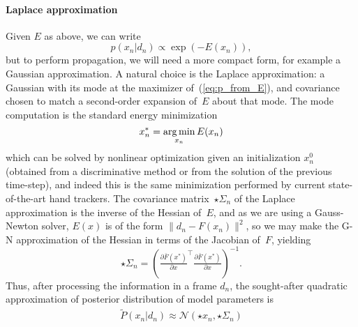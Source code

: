 \paragraph{Laplace approximation}
\label{sec:posterior}
Given $E$ as above, we can write
\begin{equation}
p(x_n|d_n) \propto \exp(-E(x_n)), 
\label{eq:p_from_E}
\end{equation}
but to perform propagation, we will need a more compact form, for example a Gaussian approximation.   A natural choice is the Laplace approximation: a Gaussian with its mode at the maximizer of~(\ref{eq:p_from_E}), and covariance chosen to match a second-order expansion of~$E$ about that mode.
The mode computation is the standard energy minimization
\begin{equation}
{x}^*_n = \operatorname*{arg\,min}_{x_n} E(x_n)
\label{eq:xmin}
\end{equation}
which can be solved by nonlinear optimization given an initialization $x_n^0$ (obtained from a discriminative method or from the solution of the previous time-step), and indeed this is the same minimization performed by current state-of-the-art hand trackers.
The covariance matrix~$\star\Sigma_n$ of the Laplace approximation is the inverse of the Hessian of~$E$, and as we are using a Gauss-Newton solver, $E(x)$ is of the form $\|d_n - F(x_n)\|^2$, so we may make the G-N approximation of the Hessian in terms of the Jacobian of~$F$, yielding
\begin{equation}
{\star{\Sigma}_n} = \left(\tfrac{\partial \bar{F}(x^*)}{\partial x}^\top \tfrac{\partial \bar{F}(x^*)}{\partial x}\right)^{-1}.
\end{equation}
Thus, after processing the information in a frame $d_n$, the sought-after quadratic approximation of posterior distribution of model parameters is 
\begin{align}
\tilde{P}(x_n|d_n) \approx \mathcal{N}\left(\star{x}_n, \star{\Sigma}_n \right)
\end{align}


